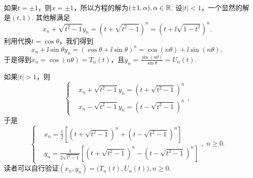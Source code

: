 \begin{solution}
  如果$t=\pm1$，则$x=\pm1$，所以方程的解为$(\pm1,\alpha),\alpha\in\mathbb R$. 设$|t|<1$，一个显然的解是$(t,1)$. 其他解满足
  \[
    x_n + \sqrt{t^2-1}y_n = \left( t + \sqrt{t^2-1} \right) ^n =
    \left( t + \ii\sqrt{1-t^2} \right) ^n.
  \]
  利用代换$t=\cos \theta$，我们得到
  \[
    x_n + \ii \sin\theta y_n = (\cos\theta + \ii \sin\theta) ^n = \cos (n\theta ) + \ii \sin(n\theta),
  \]
  于是得到$x_n=\cos(n\theta)=T_n(t)$，且$y_n=\frac{\sin(n\theta)}{\sin \theta} =U_n(t)$.

  如果$|t|>1$，则
  \[
    \left\{
      \begin{aligned}
        & x_n + \sqrt{t^2-1}y_n = \left( t + \sqrt{t^2-1} \right) ^n \\
        & x_n - \sqrt{t^2-1}y_n = \left( t - \sqrt{t^2-1} \right) ^n
      \end{aligned}
    \right.,
  \]
  于是
  \[
    \left\{
      \begin{aligned}
        & x_n = \frac12\left[
          \left( t + \sqrt{t^2-1} \right) ^n +
          \left( t - \sqrt{t^2-1} \right) ^n
        \right] \\
        & y_n = \frac1{2\sqrt{t^2-1}}\left[
          \left( t + \sqrt{t^2-1} \right) ^n -
          \left( t - \sqrt{t^2-1} \right) ^n
        \right]
      \end{aligned}
    \right.,\;n\ge0.
  \]
  读者可以自行验证$(x_n,y_n)=\big(T_n(t),U_n(t)\big),n\ge0$.
\end{solution}




